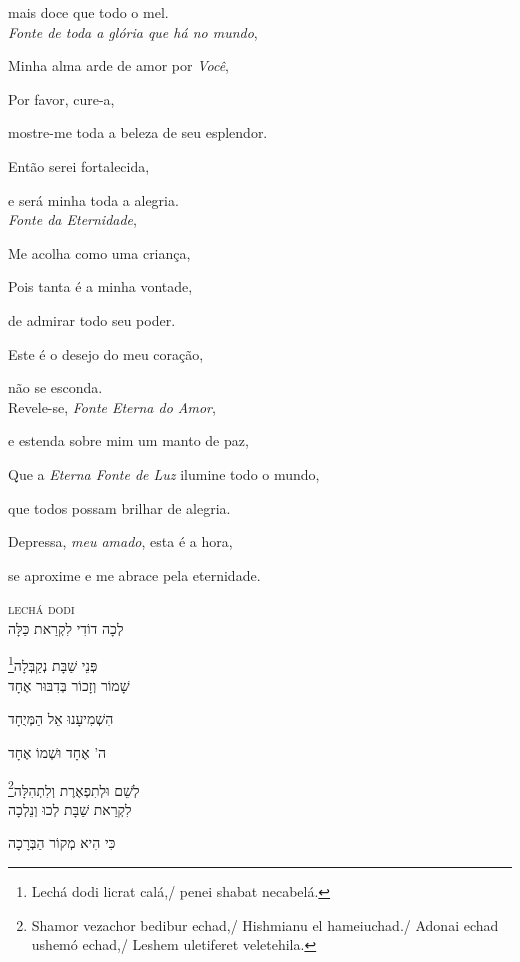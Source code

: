 mais doce que todo o mel.\\[10pt]

\emph{Fonte de toda a glória que há no mundo},

Minha alma arde de amor por \emph{Você},

Por favor, cure-a,

mostre-me toda a beleza de seu esplendor.

Então serei fortalecida,

e será minha toda a alegria.\\[10pt]

\emph{Fonte da Eternidade},

Me acolha como uma criança,

Pois tanta é a minha vontade,

de admirar todo seu poder.

Este é o desejo do meu coração,

não se esconda.\\[10pt]

Revele-se, \emph{Fonte Eterna do Amor},

e estenda sobre mim um manto de paz,

Que a \emph{Eterna Fonte de Luz} ilumine todo o mundo,

que todos possam brilhar de alegria.

Depressa, \emph{meu amado}, esta é a hora,

se aproxime e me abrace pela eternidade.

\movetoevenpage
\raggedleft

\textsc{lechá dodi}\\[15pt]

לְכָה דוֹדִי לִקְרַאת כַּלָּה

פְּנֵי שַׁבָּת נְקַבְּלָה\footnote{Lechá dodi licrat calá,/ penei shabat necabelá.}\\[10pt]

שָׁמוֹר וְזָכוֹר בְּדִבּוּר אֶחָד

הִשְׁמִיעָנוּ אֵל הַמְּיֻחָד

ה' אֶחָד וּשְׁמוֹ אֶחָד

לְשֵׁם וּלְתִפְאֶרֶת וְלִתְהִלָּה\footnote{Shamor vezachor bedibur echad,/ Hishmianu el hameiuchad./ Adonai echad ushemó echad,/ Leshem uletiferet veletehila.}\\[10pt]

לִקְרַאת שַׁבָּת לְכוּ וְנֵלְכָה

כִּי הִיא מְקוֹר הַבְּרָכָה

